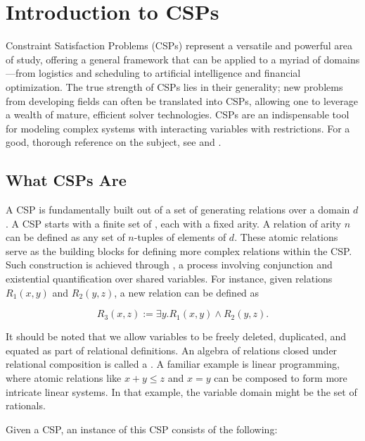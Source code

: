 \section{Introduction to CSPs}\label{sec:intro}

Constraint Satisfaction Problems (CSPs) represent a versatile and powerful area of study, offering a general framework that can be applied to a myriad of domains—from logistics and scheduling to artificial intelligence and financial optimization. The true strength of CSPs lies in their generality; new problems from developing fields can often be translated into CSPs, allowing one to leverage a wealth of mature, efficient solver technologies. CSPs are an indispensable tool for modeling complex systems with interacting variables with restrictions. For a good, thorough reference on the subject, see \citep{rossi2006handbook} and \citep{tsang1993foundations}.

\subsection{What CSPs Are}\label{sec:csp-def}

A CSP is fundamentally built out of a set of generating relations over a domain $d$. A CSP starts with a finite set of , each with a fixed arity. A relation of arity $n$ can be defined as any set of $n$-tuples of elements of $d$. These atomic relations serve as the building blocks for defining more complex relations within the CSP. Such construction is achieved through , a process involving conjunction and existential quantification over shared variables. For instance, given relations $R_1(x,y)$ and $R_2(y,z)$, a new relation can be defined as

\begin{equation}\label{equation:relation-composition-example}
R_3(x,z) := \exists y. R_1(x,y) \wedge R_2(y,z).
\end{equation}

It should be noted that we allow variables to be freely deleted, duplicated, and equated as part of relational definitions. An algebra of relations closed under relational composition is called a . A familiar example is linear programming, where atomic relations like $x+y\leq z$ and $x=y$ can be composed to form more intricate linear systems. In that example, the variable domain might be the set of rationals.

Given a CSP, an instance of this CSP consists of the following:

